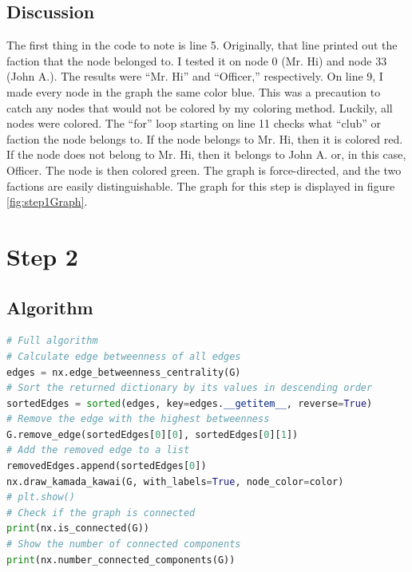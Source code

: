 \documentclass[12pt]{article}
\begin{document}
\subsection*{Discussion}

The first thing in the code to note is line 5.  Originally, that line printed out the faction that the node belonged to.  I tested it on node 0 (Mr. Hi) and node 33 (John A.).  The results were ``Mr. Hi'' and ``Officer,'' respectively.  On line 9, I made every node in the graph the same color blue.  This was a precaution to catch any nodes that would not be colored by my coloring method.  Luckily, all nodes were colored.  The ``for'' loop starting on line 11 checks what ``club'' or faction the node belongs to.  If the node belongs to Mr. Hi, then it is colored red.  If the node does not belong to Mr. Hi, then it belongs to John A. or, in this case, Officer.  The node is then colored green.  The graph is force-directed, and the two factions are easily distinguishable.  The graph for this step is displayed in figure \ref{fig:step1Graph}.

\pagebreak

\section*{Step 2}

\subsection*{Algorithm}

\begin{lstlisting}[language=Python, caption=Algorithm used to remove edges from the graph., label=lst:algorithm]
# Full algorithm
# Calculate edge betweenness of all edges
edges = nx.edge_betweenness_centrality(G)
# Sort the returned dictionary by its values in descending order
sortedEdges = sorted(edges, key=edges.__getitem__, reverse=True)
# Remove the edge with the highest betweenness
G.remove_edge(sortedEdges[0][0], sortedEdges[0][1])
# Add the removed edge to a list
removedEdges.append(sortedEdges[0])
nx.draw_kamada_kawai(G, with_labels=True, node_color=color)
# plt.show()
# Check if the graph is connected
print(nx.is_connected(G))
# Show the number of connected components
print(nx.number_connected_components(G))

\end{lstlisting}

\pagebreak
\end{document}
